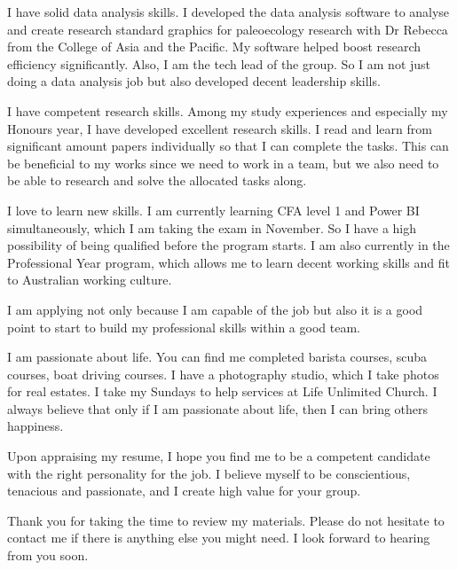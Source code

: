 \documentclass[11pt, a4paper]{awesome-cv}
\begin{document}
\begin{cvletter}
I have solid data analysis skills. I developed the data analysis software to analyse and create research standard graphics for paleoecology research with Dr Rebecca from the College of Asia and the Pacific. My software helped boost research efficiency significantly. Also, I am the tech lead of the group. So I am not just doing a data analysis job but also developed decent leadership skills.

I have competent research skills. Among my study experiences and especially my Honours year, I have developed excellent research skills. I read and learn from significant amount papers individually so that I can complete the tasks. This can be beneficial to my works since we need to work in a team, but we also need to be able to research and solve the allocated tasks along.

I love to learn new skills. I am currently learning CFA level 1 and Power BI simultaneously, which I am taking the exam in November. So I have a high possibility of being qualified before the program starts. I am also currently in the Professional Year program, which allows me to learn decent working skills and fit to Australian working culture.

I am applying not only because I am capable of the job but also it is a good point to start to build my professional skills within a good team. 

I am passionate about life. You can find me completed barista courses, scuba courses, boat driving courses. I have a photography studio, which I take photos for real estates. I take my Sundays to help services at Life Unlimited Church. I always believe that only if I am passionate about life, then I can bring others happiness.

Upon appraising my resume, I hope you find me to be a competent candidate with the right personality for the job. I believe myself to be conscientious, tenacious and passionate, and I create high value for your group.

Thank you for taking the time to review my materials. Please do not hesitate to contact me if there is anything else you might need. I look forward to hearing from you soon.



\end{cvletter}
\end{document}
